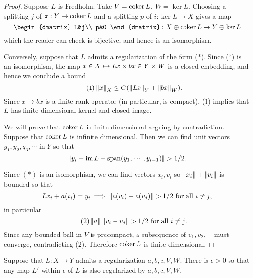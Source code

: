  \begin{proof}
   Suppose $L$ is Fredholm. Take $V=\operatorname{\mathrm{coker}} L$, $W=\ker L$. Choosing a
   splitting $j$ of $\pi:Y\to \operatorname{\mathrm{coker}} L$ and a splitting $p$ of $i:\ker
   L\to X$ gives a map
   \begin{equation*}
     \begin{dmatrix}
       L&j\\
       p&0
     \end{dmatrix}
     :X\oplus \coker L\to Y\oplus \ker L
   \end{equation*}
   which the reader can check is bijective, and hence is an
   isomorphism.

   Conversely, suppose that $L$ admits a regularization of the form
   ($\ast$). Since ($\ast$) is an isomorphism, the map $x\in X\mapsto
   Lx\times bx\in Y\times W$ is a closed embedding, and hence we
   conclude a bound
   \begin{equation*}\tag{$1$}
     \left\lVert x\right\rVert_{X}\le C(\left\lVert Lx\right\rVert_{Y}+\left\lVert bx\right\rVert_{W}).
   \end{equation*}
   Since $x\mapsto bx$ is a finite rank operator (in particular, is
   compact), ($1$) implies that $L$ has finite dimensional kernel
   and closed image.

   We will prove that $\operatorname{\mathrm{coker}} L$ is finite dimensional arguing by
   contradiction. Suppose that $\operatorname{\mathrm{coker}} L$ is infinite
   dimensional. Then we can find unit vectors $y_{1},y_{2},y_{3},\cdots$ in
   $Y$ so that $$\left\lVert y_{i}-\operatorname{\mathrm{im}}
     L-\text{span}(y_{1},\cdots,y_{i-1})\right\rVert>1/2.$$

   Since $(\ast)$ is an isomorphism, we can find vectors $x_{i},v_{i}$
   so $\left\lVert x_{i}\right\rVert+\left\lVert v_{i}\right\rVert$ is bounded so that
   \begin{equation*}
     Lx_{i}+a(v_{i})=y_{i}\implies \left\lVert a(v_{i})-a(v_{j})\right\rVert>1/2\text{
       for all $i\ne j$},
   \end{equation*}
   in particular
   \begin{equation*}\tag{2}
     \left\lVert a\right\rVert\left\lVert v_{i}-v_{j}\right\rVert>1/2\text{ for all $i\ne j$}.
   \end{equation*}
   Since any bounded ball in $V$ is precompact, a subsequence of
   $v_{1},v_{2},\cdots$ must converge, contradicting (2). Therefore
   $\operatorname{\mathrm{coker}} L$ is finite dimensional.   
 \end{proof}
 \begin{prop}
   Suppose that $L:X\to Y$ admits a regularization $a,b,c,V,W$. There
   is $\epsilon>0$ so that any map $L'$ within $\epsilon$ of $L$
   is also regularized by $a,b,c,V,W$.
 \end{prop}
